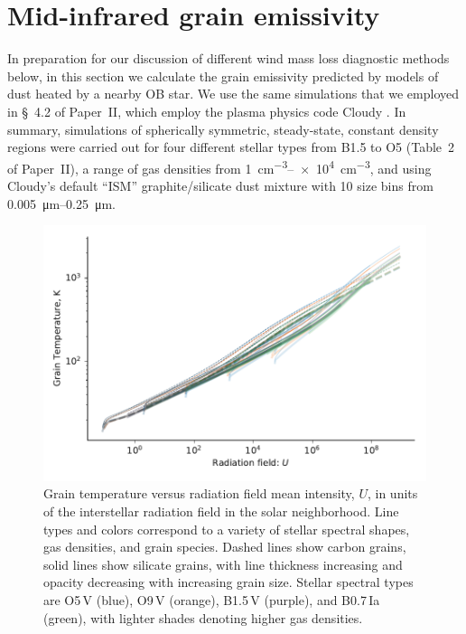 \section{Mid-infrared grain emissivity}
\label{sec:grain-temp-emiss}

In preparation for our discussion of different wind mass loss
diagnostic methods below, in this section we calculate the grain
emissivity predicted by models of dust heated by a nearby OB star.  We
use the same simulations that we employed in \S~4.2 of Paper~II,
which employ the plasma physics code Cloudy \citep{Ferland:2013a,
  Ferland:2017a}.  In summary, simulations of spherically symmetric,
steady-state, constant density \hii{} regions were carried out for
four different stellar types from B1.5 to O5 (Table~2 of Paper~II), a
range of gas densities from \SIrange{1}{e4}{cm^{-3}}, and using
Cloudy's default ``ISM'' graphite/silicate dust mixture with 10 size
bins from \SIrange{0.005}{0.25}{\um}.  

\begin{figure}
  \centering
  \includegraphics[width=\linewidth]{figs/grain-T-vs-U}
  \caption{Grain temperature versus radiation field mean intensity,
    \(U\), in units of the interstellar radiation field in the solar
    neighborhood.  Line types and colors correspond to a variety of
    stellar spectral shapes, gas densities, and grain species.  Dashed
    lines show carbon grains, solid lines show silicate grains, with
    line thickness increasing and opacity decreasing with increasing
    grain size.  Stellar spectral types are O5\,V (blue), O9\,V
    (orange), B1.5\,V (purple), and B0.7\,Ia (green), with lighter
    shades denoting higher gas densities. }
  \label{fig:grain-T-vs-U}
\end{figure}

